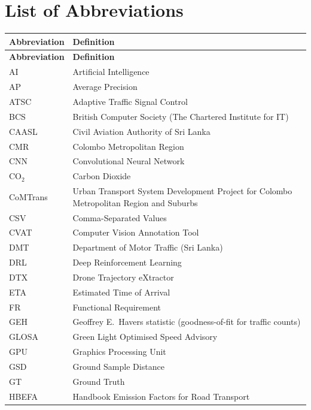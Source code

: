 \chapter*{List of Abbreviations}
\thispagestyle{plain}

\renewcommand{\arraystretch}{1.15}
\begin{longtable}{@{}p{}p{}@{}}
\toprule
\textbf{Abbreviation} & \textbf{Definition}\\
\midrule
\endfirsthead
\toprule
\textbf{Abbreviation} & \textbf{Definition}\\
\midrule
\endhead
\bottomrule
\endlastfoot
AI & Artificial Intelligence\\
AP & Average Precision\\
ATSC & Adaptive Traffic Signal Control\\
BCS & British Computer Society (The Chartered Institute for IT)\\
CAASL & Civil Aviation Authority of Sri Lanka\\
CMR & Colombo Metropolitan Region\\
CNN & Convolutional Neural Network\\
CO$_2$ & Carbon Dioxide\\
CoMTrans & Urban Transport System Development Project for Colombo Metropolitan Region and Suburbs\\
CSV & Comma-Separated Values\\
CVAT & Computer Vision Annotation Tool\\
DMT & Department of Motor Traffic (Sri Lanka)\\
DRL & Deep Reinforcement Learning\\
DTX & Drone Trajectory eXtractor\\
ETA & Estimated Time of Arrival\\
FR & Functional Requirement\\
GEH & Geoffrey E.\ Havers statistic (goodness-of-fit for traffic counts)\\
GLOSA & Green Light Optimised Speed Advisory\\
GPU & Graphics Processing Unit\\
GSD & Ground Sample Distance\\
GT & Ground Truth\\
HBEFA & Handbook Emission Factors for Road Transport\\

\end{longtable}
